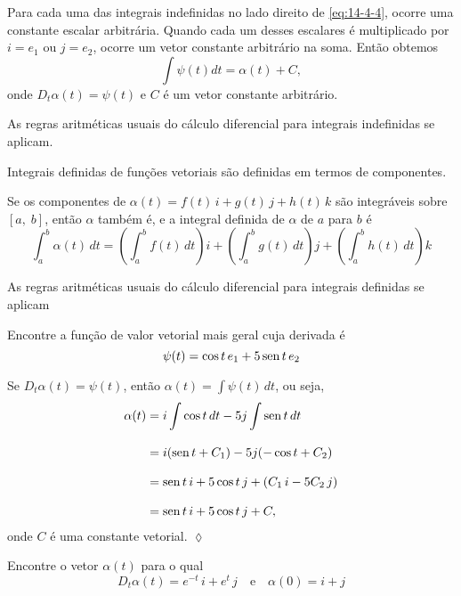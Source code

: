 Para cada uma das integrais indefinidas no lado direito de \eqref{eq:14-4-4}, ocorre uma constante escalar arbitrária. Quando cada um desses escalares
é multiplicado por \(i=e_{1}\) ou \(j=e_{2}\), ocorre um vetor constante arbitrário na soma. Então obtemos
\begin{equation*}
\int \psi(t) dt = \alpha(t) + C,
\end{equation*}
onde \(D_{t}\alpha(t) = \psi(t)\) e \(C\) é um vetor constante arbitrário.

As regras aritméticas usuais do cálculo diferencial para integrais indefinidas se aplicam.

Integrais definidas de funções vetoriais são definidas em termos de componentes.
\begin{defi}
Se os componentes de $\alpha(t) = f(t)\,i+g(t)\,j+h(t)\,k$ são integráveis sobre $[a,\; b]$, então $\alpha$ também é, e a \textsf{integral definida}
de $\alpha$ de $a$ para $b$ é
\begin{equation*}
\int_{a}^{b}\alpha(t)\, dt=\left(\int_{a}^{b}f(t)\, dt \right)i+\left(\int_{a}^{b}g(t)\, dt \right)j+\left(\int_{a}^{b}h(t)\, dt \right)k
\end{equation*}
\end{defi}

As regras aritméticas usuais do cálculo diferencial para integrais definidas se aplicam
\begin{exc}
Encontre a função de valor vetorial mais geral cuja derivada é
\begin{equation*}
  \psi(t) = \cos t\, e_{1}+ 5\operatorname{sen} t\, e_{2}
\end{equation*}
\end{exc}

\solo
Se  \(D_{t}\alpha(t)=\psi(t)\), então \(\alpha(t) = \displaystyle{\int \psi(t)\, dt}\), ou seja,
\begin{align*}
\alpha(t)&= i\, \displaystyle{\int \cos t\, dt}-5j\,\displaystyle{ \int \operatorname{sen}t\, dt}\\[2ex]
   &= i(\operatorname{sen} t + C_{1}) - 5j(-\cos t + C_{2})\\[2ex]
   &= \operatorname{sen} t\, i +5 \cos  t\, j + (C_{1}\,i - 5C_{2}\,j)\\[2ex]
   &= \operatorname{sen} t\, i + 5 \cos t\, j + C,
\end{align*}
onde \(C\) é uma constante vetorial. \hfill $\lozenge$

\begin{exc}
Encontre o vetor \(\alpha(t)\) para o qual
\begin{equation*}
D_{t}\alpha(t) = e^{-t}\, i + e^{t}\, j \quad \text{e}\quad \alpha(0) = i + j
\end{equation*}
\end{exc}

